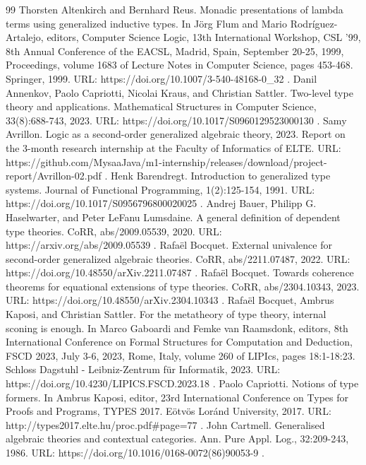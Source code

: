 \documentclass[10pt,a4paper]{amsart}
\begin{document}
\begin{thebibliography}{99}
 Thorsten Altenkirch and Bernhard Reus. Monadic presentations of lambda terms using generalized inductive types. In Jörg Flum and Mario Rodríguez-Artalejo, editors, Computer Science Logic, 13th International Workshop, CSL '99, 8th Annual Conference of the EACSL, Madrid, Spain, September 20-25, 1999, Proceedings, volume 1683 of Lecture Notes in Computer Science, pages 453-468. Springer, 1999. URL: https://doi.org/10.1007/3-540-48168-0\_32 .
 Danil Annenkov, Paolo Capriotti, Nicolai Kraus, and Christian Sattler. Two-level type theory and applications. Mathematical Structures in Computer Science, 33(8):688-743, 2023. URL: https://doi.org/10.1017/S0960129523000130 .
 Samy Avrillon. Logic as a second-order generalized algebraic theory, 2023. Report on the 3-month research internship at the Faculty of Informatics of ELTE. URL: https://github.com/MysaaJava/m1-internship/releases/download/project-report/Avrillon-02.pdf .
 Henk Barendregt. Introduction to generalized type systems. Journal of Functional Programming, 1(2):125-154, 1991. URL: https://doi.org/10.1017/S0956796800020025 .
 Andrej Bauer, Philipp G. Haselwarter, and Peter LeFanu Lumsdaine. A general definition of dependent type theories. CoRR, abs/2009.05539, 2020. URL: https://arxiv.org/abs/2009.05539 .
 Rafaël Bocquet. External univalence for second-order generalized algebraic theories. CoRR, abs/2211.07487, 2022. URL: https://doi.org/10.48550/arXiv.2211.07487 .
 Rafaël Bocquet. Towards coherence theorems for equational extensions of type theories. CoRR, abs/2304.10343, 2023. URL: https://doi.org/10.48550/arXiv.2304.10343 .
 Rafaël Bocquet, Ambrus Kaposi, and Christian Sattler. For the metatheory of type theory, internal sconing is enough. In Marco Gaboardi and Femke van Raamsdonk, editors, 8th International Conference on Formal Structures for Computation and Deduction, FSCD 2023, July 3-6, 2023, Rome, Italy, volume 260 of LIPIcs, pages 18:1-18:23. Schloss Dagstuhl - Leibniz-Zentrum für Informatik, 2023. URL: https://doi.org/10.4230/LIPICS.FSCD.2023.18 .
 Paolo Capriotti. Notions of type formers. In Ambrus Kaposi, editor, 23rd International Conference on Types for Proofs and Programs, TYPES 2017. Eötvös Loránd University, 2017. URL: http://types2017.elte.hu/proc.pdf\#page=77 .
 John Cartmell. Generalised algebraic theories and contextual categories. Ann. Pure Appl. Log., 32:209-243, 1986. URL: https://doi.org/10.1016/0168-0072(86)90053-9 .

\end{thebibliography}
\end{document}
